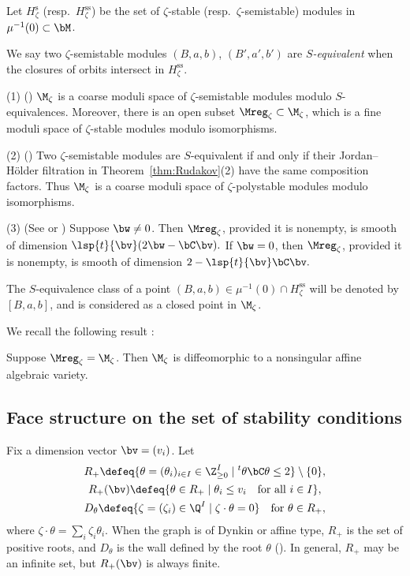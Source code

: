Let $H_{\zeta}^{\operatorname{s}}$ (resp.\
$H_{\zeta}^{\operatorname{ss}}$) be the set of
$\zeta$-stable (resp.\ $\zeta$-semistable) modules in
$\mu^{-1}(0)\subset\bM$.

We say two $\zeta$-semistable modules $(B,a,b)$, $(B',a',b')$
are {\it $S$-equivalent\/} when the closures of orbits intersect in
$H_{\zeta}^{\operatorname{ss}}$.

\begin{Proposition}\label{prop:dim}
  \textup{(1) (\cite{King})} $\M_\zeta$ is a coarse moduli space of
  $\zeta$-semistable modules modulo $S$-equivalences.
%
  Moreover, there is an open subset $\Mreg_\zeta\subset\M_\zeta$,
  which is a fine moduli space of $\zeta$-stable modules modulo
  isomorphisms.

  \textup{(2) (\cite{King})} Two $\zeta$-semistable modules are
  $S$-equivalent if and only if their Jordan--H\"older filtration
  in Theorem~{\rm \ref{thm:Rudakov}(2)} have the same composition factors. Thus
  $\M_\zeta$ is a coarse moduli space of $\zeta$-polystable modules
  modulo isomorphisms.

  \textup{(3) (See \cite[2.6]{Na-quiver} or \cite[{3.12}]{Na-alg})}
  Suppose $\bw \neq 0$. Then
  $\Mreg_\zeta$, provided it is nonempty, is smooth of dimension
\(
   \lsp{t}{\bv}(2\bw - \bC \bv).
\)
If $\bw = 0$, then $\Mreg_\zeta$, provided it is nonempty, is smooth
of dimension
\(
   2 - \lsp{t}{\bv}\bC \bv.
\)
\end{Proposition}

The $S$-equivalence class of a point $(B,a,b)\in\mu^{-1}(0)\cap
H_{\zeta}^{\operatorname{ss}}$ will be denoted by $[B,a,b]$, and is
considered as a closed point in $\M_\zeta$.



We recall the following result \cite[3.1, 4.2]{Na-quiver}:

\begin{Theorem}\label{thm:affine}
  Suppose $\Mreg_\zeta = \M_\zeta$. Then $\M_\zeta$ is diffeomorphic
  to a nonsingular affine algebraic variety.
\end{Theorem}

\subsection{Face structure on the set of stability conditions}

Fix a dimension vector $\bv = (v_i)$. Let
\begin{gather*}
   R_+  \defeq \{ \theta = (\theta_i)_{i\in I} \in \Z_{\ge 0}^I \mid
     {}^t\theta \bC \theta \le 2\} \setminus \{0\}, \\
   R_+(\bv) \defeq \{ \theta\in R_+ \mid \theta_i \le v_i
       \quad\text{for all $i\in I$}\}, \\
   D_\theta \defeq \{ \zeta = (\zeta_i)\in \Q^I \mid
   \zeta\cdot \theta = 0 \} \quad\text{for $\theta\in R_+$},
\end{gather*}
where $\zeta\cdot \theta = \sum_i \zeta_i\theta_i$. When the graph is
of Dynkin or af\/f\/ine type, $R_+$ is the set of positive roots, and
$D_\theta$ is the wall def\/ined by the root $\theta$
(\cite[Proposition~5.10]{Kac}).
%
In general, $R_+$ may be an inf\/inite set, but $R_+(\bv)$ is always
f\/inite.

